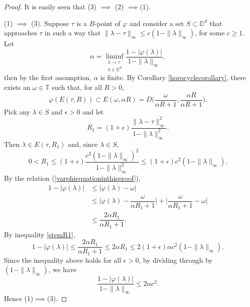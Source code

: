 \documentclass[11pt, reqno]{amsart}
\newcommand\1{\boldsymbol {1}}
\numberwithin{equation}{section}
\begin{document}
\begin{proof}
It is easily seen that (3) $\implies$ (2) $\implies$(1).

(1) $\implies$ (3). Suppose $\tau$ is a $B$-point of $\varphi$ and consider a set $S\subset \mathbb{D}^{d}$ that approaches $\tau$ in such a way that $ \|\lambda - \tau \|_{\infty}\leq c ( 1 - \|\lambda\|_{\infty})$, for some $c\geq 1$. Let 
$$\alpha = \liminf_{\substack{\lambda\rightarrow \tau \\ \lambda\in\mathbb{D}^{d}}} \dfrac{1-\lvert \varphi(\lambda)\rvert}{1-\|\lambda\|_{\infty}},$$
then by the first assumption, $\alpha$ is finite. By Corollary \ref{horocyclecorollary}, there exists an $\omega\in\mathbb{T}$ such that, for all $R>0$, 
\begin{equation}\label{varphiequationinthisproof}
\varphi(E(\tau,R))\subset E(\omega,\alpha R) = D\bigg(\dfrac{\omega}{\alpha R+1}, \dfrac{\alpha R}{\alpha R+1}\bigg).
\end{equation}
Pick any $\lambda\in S$ and $\epsilon>0$ and let 
$$R_1=(1+\epsilon)\dfrac{\|\lambda-\tau\|_{\infty}^{2}}{1-\|\lambda\|_{\infty}^{2}}.$$
Then $\lambda\in E(\tau, R_1)$ and, since $\lambda \in S$, 
\begin{equation}\label{stemR1}
0<R_1 \leq (1+\epsilon)\dfrac{c^{2}(1-\|\lambda\|_{\infty})^{2}}{1-\|\lambda\|_{\infty}^{2}}\leq (1+\epsilon)c^{2}(1-\|\lambda\|_{\infty}).
\end{equation}
By the relation (\ref{varphiequationinthisproof}),
\begin{align*}
1-\lvert \varphi(\lambda)\rvert & \leq \lvert \varphi(\lambda)-\omega\rvert \\
& \leq  \lvert \varphi(\lambda)-\dfrac{\omega}{\alpha R_1+1} \rvert + 
\lvert \dfrac{\omega}{\alpha R_1+1} - \omega \rvert\\
                                   & \leq \dfrac{2\alpha R_1}{\alpha R_1+1}.
                                    \end{align*}                            
By inequality \eqref{stemR1},
$$1-\lvert \varphi(\lambda)\rvert \leq \dfrac{2\alpha R_1}{\alpha R_1+1} \leq 2\alpha R_1 
                                    \leq 2(1+\epsilon)\alpha c^{2}(1-\|\lambda\|_{\infty}).$$
Since the inequality above holds for all $\epsilon>0$, by dividing through by $(1-\|\lambda\|_{\infty})$, we have
$$\dfrac{1-\lvert \varphi(\lambda) \rvert}{1-\|\lambda\|_{\infty}} \leq 2\alpha c^{2}.$$
Hence (1)$\implies$(3).


\end{proof}
\end{document}
